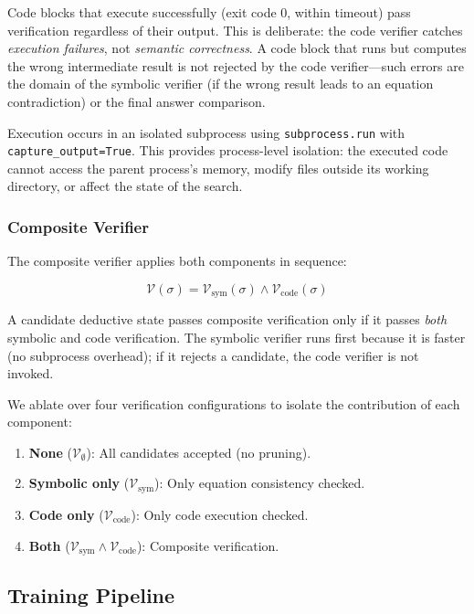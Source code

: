 \documentclass[11pt,a4paper]{article}
\begin{document}
Code blocks that execute successfully (exit code 0, within timeout) pass
verification regardless of their output. This is deliberate: the code verifier
catches \emph{execution failures}, not \emph{semantic correctness}. A code
block that runs but computes the wrong intermediate result is not rejected by
the code verifier---such errors are the domain of the symbolic verifier (if
the wrong result leads to an equation contradiction) or the final answer
comparison.

Execution occurs in an isolated subprocess using \texttt{subprocess.run} with
\texttt{capture\_output=True}. This provides process-level isolation: the
executed code cannot access the parent process's memory, modify files outside
its working directory, or affect the state of the search.

\subsubsection{Composite Verifier}

The composite verifier applies both components in sequence:

\begin{equation}
\mathcal{V}(\sigma) = \mathcal{V}_{\text{sym}}(\sigma) \wedge \mathcal{V}_{\text{code}}(\sigma)
\end{equation}

A candidate deductive state passes composite verification only if it passes
\emph{both} symbolic and code verification. The symbolic verifier runs first
because it is faster (no subprocess overhead); if it rejects a candidate, the
code verifier is not invoked.

We ablate over four verification configurations to isolate the contribution of
each component:
\begin{enumerate}[nosep]
    \item \textbf{None} ($\mathcal{V}_\emptyset$): All candidates accepted (no pruning).
    \item \textbf{Symbolic only} ($\mathcal{V}_{\text{sym}}$): Only equation consistency checked.
    \item \textbf{Code only} ($\mathcal{V}_{\text{code}}$): Only code execution checked.
    \item \textbf{Both} ($\mathcal{V}_{\text{sym}} \wedge \mathcal{V}_{\text{code}}$): Composite verification.
\end{enumerate}


\subsection{Training Pipeline}
\label{sec:training}
\end{document}
